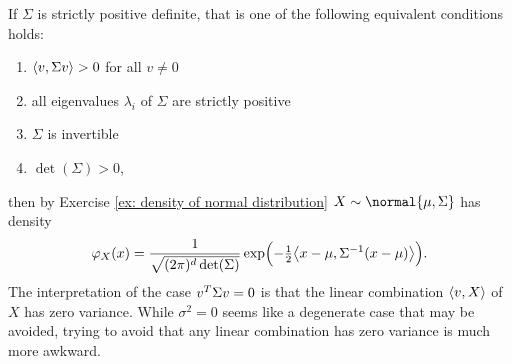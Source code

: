 \begin{remark}
    If \(\Sigma\) is strictly positive definite, that is one of the following
    equivalent conditions holds:
    \begin{enumerate}[label={(\roman*)},noitemsep]
        \item \(\scp{v, \Sigma v} > 0\) for all \(v\neq 0\)
        \item all eigenvalues \(\lambda_i\) of \(\Sigma\) are strictly positive
        \item \(\Sigma\) is invertible
        \item \(\det(\Sigma) > 0\),
    \end{enumerate}
    then by Exercise \ref{ex: density of normal distribution} \(X\sim \normal{\mu, \Sigma}\) has density
    \[
        \density_X(x)
        = \frac1{\sqrt{(2\pi)^\dims \det(\Sigma)}}
        \exp\Bigl(-\tfrac12 \scp[\big]{x - \mu, \Sigma^{-1}(x - \mu)}\Bigr).
    \]
    The interpretation of the case \(v^\transpose \Sigma v = 0\) is that the
    linear combination \(\scp{v,X}\) of \(X\) has zero variance. While
    \(\sigma^2=0\) seems like a degenerate case that may be avoided, trying to
    avoid that any linear combination has zero variance is much more awkward.
\end{remark}
